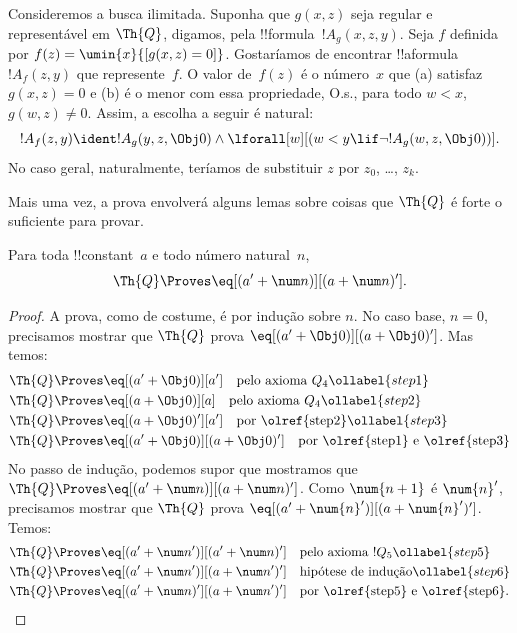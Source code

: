 \documentclass[../../../include/open-logic-section]{subfiles}
\begin{document}

Consideremos a busca ilimitada. Suponha que $g(x, z)$ seja regular e
representável em $\Th{Q}$, digamos, pela !!{formula}~$!A_g(x, z, y)$.
Seja $f$ definida por $f(z) = \umin{x}{[g(x, z) = 0]}$. Gostaríamos de
encontrar !!a{formula}~$!A_f(z, y)$ que represente~$f$. O valor
de~$f(z)$ é o número~$x$ que (a) satisfaz $g(x, z) = 0$ e (b) é o menor
com essa propriedade, O.s.\@, para todo $w < x$, $g(w, z) \neq 0$.
Assim, a escolha a seguir é natural:
\[
!A_f(z,y) \ident !A_g(y, z, \Obj 0) \land \lforall[w][(w < y \lif \lnot
  !A_g(w, z, \Obj 0))].
\]
No caso geral, naturalmente, teríamos de substituir $z$ por
$z_0$, \dots, $z_k$.

Mais uma vez, a prova envolverá alguns lemas sobre coisas que $\Th{Q}$
é forte o suficiente para provar.

\begin{lem}
 Para toda !!{constant}~$a$ e todo número
natural~$n$,
\[
\Th{Q} \Proves \eq[(a' + \num n)][(a + \num n)'].
\]
\end{lem}

\begin{proof}
A prova, como de costume, é por indução sobre $n$. No caso base,
$n = 0$, precisamos mostrar que $\Th{Q}$ prova
$\eq[(a' + \Obj 0)][(a + \Obj 0)']$. Mas temos:
\begin{align}
  \Th{Q} & \Proves \eq[(a' + \Obj 0)][a'] \quad \text{pelo axioma $Q_4$}
  \ollabel{step1}\\
  \Th{Q} & \Proves  \eq[(a + \Obj 0)][a] \quad \text{pelo axioma $Q_4$}
  \ollabel{step2} \\
  \Th{Q} & \Proves \eq[(a + \Obj 0)'][a'] \quad \text{por \olref{step2}}
  \ollabel{step3} \\
  \Th{Q} & \Proves \eq[(a' + \Obj 0)][(a + \Obj 0)'] \quad
  \text{por \olref{step1} e \olref{step3}}\notag
\end{align}
No passo de indução, podemos supor que mostramos que $\Th{Q}
\Proves \eq[(a' + \num n)][(a + \num n)']$. Como $\num{n+1}$ é
$\num{n}'$, precisamos mostrar que $\Th{Q}$ prova
$\eq[(a' + \num{n}')][(a + \num{n}')']$. Temos:
\begin{align}
  \Th{Q} & \Proves \eq[(a' + \num n')][(a' + \num n)'] \quad
  \text{pelo axioma $!Q_5$} \ollabel{step5}\\
  \Th{Q} & \Proves \eq[(a' + \num n')][(a + \num n')'] \quad
  \text{hipótese de indução} \ollabel{step6}\\
  \Th{Q} & \Proves \eq[(a' + \num n)'][(a + \num n')'] \quad
  \text{por \olref{step5} e \olref{step6}.} \notag
\end{align}
\end{proof}
\end{document}
